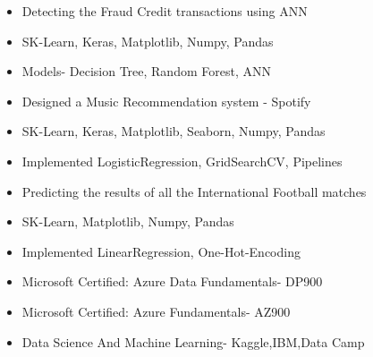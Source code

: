 \documentclass[10pt,a4paper,ragged2e]{altacv}
\begin{document}
\divider

\begin{itemize}
\item Detecting the Fraud Credit transactions using ANN
\item SK-Learn, Keras, Matplotlib, Numpy, Pandas
\item Models- Decision Tree, Random Forest, ANN


\end{itemize}

\divider


\begin{itemize}
\item Designed a Music Recommendation system - Spotify
\item SK-Learn, Keras, Matplotlib, Seaborn, Numpy, Pandas
\item Implemented LogisticRegression, GridSearchCV, Pipelines

\end{itemize}

\divider



\begin{itemize}
\item Predicting the results of all the International Football matches
\item SK-Learn, Matplotlib, Numpy, Pandas
\item Implemented LinearRegression, One-Hot-Encoding


\end{itemize}







\begin{itemize}
   \item Microsoft Certified: Azure Data Fundamentals- DP900
    \item Microsoft Certified: Azure Fundamentals- AZ900
    \item Data Science And Machine Learning- Kaggle,IBM,Data Camp
 
   
   
\end{itemize}
\end{document}
